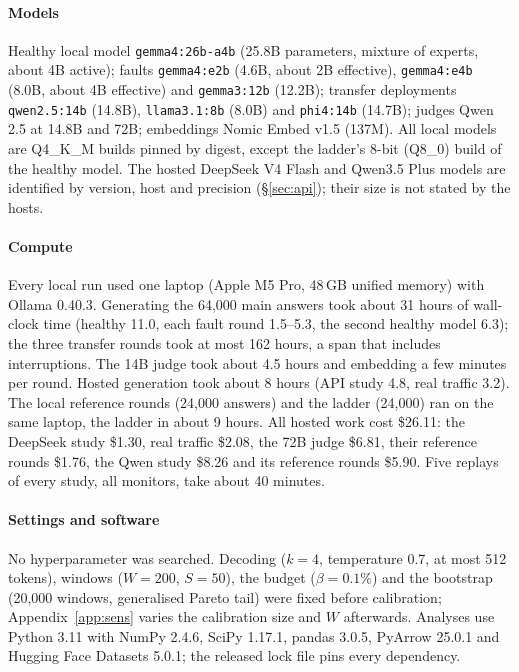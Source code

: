 \documentclass{article}
\begin{document}
\paragraph{Models} Healthy local model \texttt{gemma4:26b-a4b} (25.8B parameters,
mixture of experts, about 4B active); faults \texttt{gemma4:e2b} (4.6B, about 2B
effective), \texttt{gemma4:e4b} (8.0B, about 4B effective) and \texttt{gemma3:12b}
(12.2B); transfer deployments \texttt{qwen2.5:14b} (14.8B), \texttt{llama3.1:8b}
(8.0B) and \texttt{phi4:14b} (14.7B); judges Qwen 2.5 at 14.8B and 72B; embeddings
Nomic Embed v1.5 (137M). All local models are Q4\_K\_M builds pinned by digest,
except the ladder's 8-bit (Q8\_0) build of the healthy model. The hosted DeepSeek V4
Flash and Qwen3.5 Plus models are identified by version, host and precision
(\S\ref{sec:api}); their size is not stated by the hosts.

\paragraph{Compute} Every local run used one laptop (Apple M5 Pro, 48\,GB unified
memory) with Ollama 0.40.3. Generating the 64{,}000 main answers took about 31
hours of wall-clock time (healthy 11.0, each fault round 1.5--5.3, the second
healthy model 6.3); the three transfer rounds took at most 162 hours, a span that
includes interruptions. The 14B judge took about 4.5 hours and embedding a few
minutes per round. Hosted generation took about 8 hours (API study 4.8, real
traffic 3.2). The local reference rounds (24{,}000 answers) and the ladder (24{,}000)
ran on the same laptop, the ladder in about 9 hours. All hosted work cost \$26.11:
the DeepSeek study \$1.30, real traffic \$2.08, the 72B judge \$6.81, their
reference rounds \$1.76, the Qwen study \$8.26 and its reference rounds \$5.90.
Five replays of every study, all monitors, take about 40 minutes.

\paragraph{Settings and software} No hyperparameter was searched. Decoding ($k=4$,
temperature 0.7, at most 512 tokens), windows ($W=200$, $S=50$), the budget
($\beta=0.1\%$) and the bootstrap (20{,}000 windows, generalised Pareto tail) were
fixed before calibration; Appendix~\ref{app:sens} varies the calibration size and
$W$ afterwards. Analyses use Python 3.11 with NumPy 2.4.6, SciPy 1.17.1, pandas
3.0.5, PyArrow 25.0.1 and Hugging Face Datasets 5.0.1; the released lock file pins
every dependency.
\end{document}
